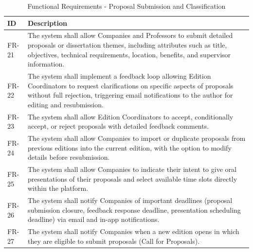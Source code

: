     {
    \begin{table}[H]
        \centering
        \caption{Functional Requirements - Proposal Submission and Classification}
        \begin{tabular}{|l|p{12cm}|} %
            \hline
            \textbf{ID} & \textbf{Description} \\ \hline
            FR-21 & The system shall allow Companies and Professors to submit detailed proposals or dissertation themes, including attributes such as title, objectives, technical requirements, location, benefits, and supervisor information. \\ \hline
            FR-22 & The system shall implement a feedback loop allowing Edition Coordinators to request clarifications on specific aspects of proposals without full rejection, triggering email notifications to the author for editing and resubmission. \\ \hline
            FR-23 & The system shall allow Edition Coordinators to accept, conditionally accept, or reject proposals with detailed feedback comments. \\ \hline
            FR-24 & The system shall allow Companies to import or duplicate proposals from previous editions into the current edition, with the option to modify details before resubmission. \\ \hline
            FR-25 & The system shall allow Companies to indicate their intent to give oral presentations of their proposals and select available time slots directly within the platform. \\ \hline
            FR-26 & The system shall notify Companies of important deadlines (proposal submission closure, feedback response deadline, presentation scheduling deadline) via email and in-app notifications. \\ \hline
            FR-27 & The system shall notify Companies when a new edition opens in which they are eligible to submit proposals (Call for Proposals). \\ \hline
        \end{tabular}  
    \end{table}    
    }

